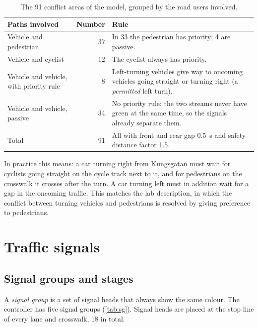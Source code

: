 \documentclass[11pt,a4paper]{article}
\begin{document}
\begin{table}[!htb]
\centering
\caption[Conflict areas]{The 91 conflict areas of the model, grouped by the road users involved.}
\label{tab:conflicts}
\small
\begin{tabularx}{\textwidth}{lrX}
\toprule
\textbf{Paths involved} & \textbf{Number} & \textbf{Rule}\\
\midrule
Vehicle and pedestrian & 37 & In 33 the pedestrian has priority; 4 are passive.\\
Vehicle and cyclist & 12 & The cyclist always has priority.\\
Vehicle and vehicle, with priority rule & 8 & Left-turning vehicles give way to oncoming vehicles
going straight or turning right (a \emph{permitted} left turn).\\
Vehicle and vehicle, passive & 34 & No priority rule: the two streams never have green at the same
time, so the signals already separate them.\\
\midrule
Total & 91 & All with front and rear gap 0.5~s and safety distance factor 1.5.\\
\bottomrule
\end{tabularx}
\end{table}

In practice this means: a car turning right from Kungsgatan must wait for cyclists going straight
on the cycle track next to it, and for pedestrians on the crosswalk it crosses after the turn. A
car turning left must in addition wait for a gap in the oncoming traffic. This matches the lab
description, in which the conflict between turning vehicles and pedestrians is resolved by giving
preference to pedestrians.

\section{Traffic signals}
\label{sec:signals}

\subsection{Signal groups and stages}

A \emph{signal group} is a set of signal heads that always show the same colour. The controller has
five signal groups (\cref{tab:sg}). Signal heads are placed at the stop line of every lane and
crosswalk, 18 in total.
\end{document}
